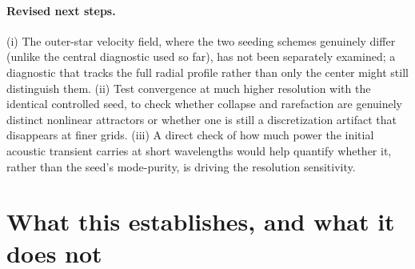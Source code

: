 \documentclass[11pt]{article}
\begin{document}
\paragraph{Revised next steps.} (i) The outer-star velocity field, where the two seeding schemes genuinely differ (unlike the central diagnostic used so far), has not been separately examined; a diagnostic that tracks the full radial profile rather than only the center might still distinguish them. (ii) Test convergence at much higher resolution with the identical controlled seed, to check whether collapse and rarefaction are genuinely distinct nonlinear attractors or whether one is still a discretization artifact that disappears at finer grids. (iii) A direct check of how much power the initial acoustic transient carries at short wavelengths would help quantify whether it, rather than the seed's mode-purity, is driving the resolution sensitivity.

\section{What this establishes, and what it does not}
\label{sec:discussion}
\end{document}

